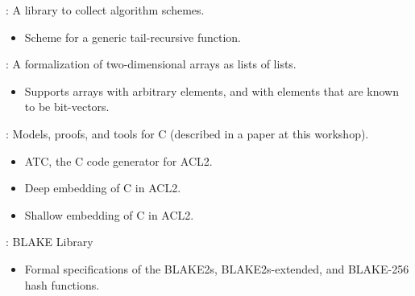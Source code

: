 
\begin{frame}

\newlibtitle

:
A library to collect algorithm schemes.
\begin{itemize}
\item Scheme for a generic tail-recursive function.
\end{itemize}

\end{frame}


\begin{frame}

\newlibtitle

:
A formalization of two-dimensional arrays as lists of lists.
\begin{itemize}

\item Supports arrays with arbitrary elements, and with elements that
  are known to be bit-vectors.

\end{itemize}

\end{frame}


\begin{frame}

\newlibtitle

:
Models, proofs, and tools for C (described in a paper at this workshop).
\begin{itemize}
\item ATC, the C code generator for ACL2.
\item Deep embedding of C in ACL2.
\item Shallow embedding of C in ACL2.
\end{itemize}

\end{frame}


\begin{frame}

\newlibtitle

: BLAKE Library

\begin{itemize}

\item Formal specifications of the BLAKE2s, BLAKE2s-extended, and
  BLAKE-256 hash functions.

\end{itemize}

\end{frame}

